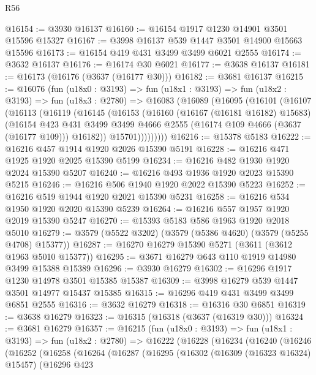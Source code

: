 \begin{lexlean}{R56}
\begin{coremodule}
@16154 := @3930 @16137
@16160 := @16154 @1917 @1230 @14901 @3501 @15596 @15327
@16167 := @3998 @16137 @539 @1447 @3501 @14900 @15663 @15596
@16173 := @16154 @419 @431 @3499 @3499 @6021 @2555
@16174 := @3632 @16137
@16176 := @16174 @30 @6021
@16177 := @3638 @16137
@16181 := @16173 (@16176 (@3637 (@16177 @30)))
@16182 := @3681 @16137
@16215 := @16076
    (fun (u18x0 : @3193) =>
    fun (u18x1 : @3193) =>
    fun (u18x2 : @3193) =>
    fun (u18x3 : @2780) =>
    @16083
      (@16089
        (@16095
          (@16101
            (@16107
              (@16113
                (@16119
                  (@16145
                    (@16153
                      (@16160
                        (@16167 (@16181 @16182) @15683)
                        (@16154
                          @423
                          @431
                          @3499
                          @3499
                          @4666
                          @2555
                          (@16174 @109 @4666 (@3637 (@16177 @109)))
                          @16182))
                      @15701)))))))))
@16216 := @15378 @5183
@16222 := @16216 @457 @1914 @1920 @2026 @15390 @5191
@16228 := @16216 @471 @1925 @1920 @2025 @15390 @5199
@16234 := @16216 @482 @1930 @1920 @2024 @15390 @5207
@16240 := @16216 @493 @1936 @1920 @2023 @15390 @5215
@16246 := @16216 @506 @1940 @1920 @2022 @15390 @5223
@16252 := @16216 @519 @1944 @1920 @2021 @15390 @5231
@16258 := @16216 @534 @1950 @1920 @2020 @15390 @5239
@16264 := @16216 @557 @1957 @1920 @2019 @15390 @5247
@16270 := @15393 @5183 @586 @1963 @1920 @2018 @5010
@16279 := @3579 (@5522 @3202) (@3579 (@5386 @4620) (@3579 (@5255 @4708) @15377))
@16287 := @16270 @16279 @15390 @5271 (@3611 (@3612 @1963 @5010 @15377))
@16295 := @3671 @16279 @643 @110 @1919 @14980 @3499 @15388 @15389
@16296 := @3930 @16279
@16302 := @16296 @1917 @1230 @14978 @3501 @15385 @15387
@16309 := @3998 @16279 @539 @1447 @3501 @14977 @15437 @15385
@16315 := @16296 @419 @431 @3499 @3499 @6851 @2555
@16316 := @3632 @16279
@16318 := @16316 @30 @6851
@16319 := @3638 @16279
@16323 := @16315 (@16318 (@3637 (@16319 @30)))
@16324 := @3681 @16279
@16357 := @16215
    (fun (u18x0 : @3193) =>
    fun (u18x1 : @3193) =>
    fun (u18x2 : @2780) =>
    @16222
      (@16228
        (@16234
          (@16240
            (@16246
              (@16252
                (@16258
                  (@16264
                    (@16287
                      (@16295
                        (@16302
                          (@16309 (@16323 @16324) @15457)
                          (@16296
                            @423

\end{coremodule}
\end{lexlean}
